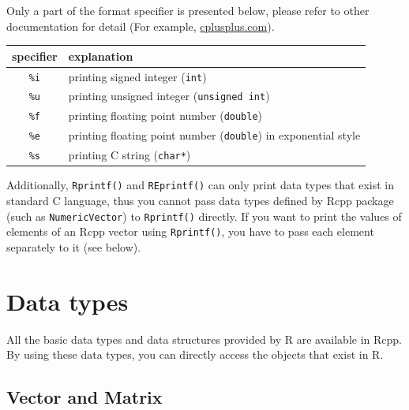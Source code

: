 \documentclass[]{book}
\newenvironment{Shaded}{\begin{snugshade}}{\end{snugshade}}
\newcommand{\CommentTok}[1]{\textcolor[rgb]{0.56,0.35,0.01}{\textit{#1}}}
\newcommand{\ControlFlowTok}[1]{\textcolor[rgb]{0.13,0.29,0.53}{\textbf{#1}}}
\newcommand{\DataTypeTok}[1]{\textcolor[rgb]{0.13,0.29,0.53}{#1}}
\newcommand{\DecValTok}[1]{\textcolor[rgb]{0.00,0.00,0.81}{#1}}
\newcommand{\NormalTok}[1]{#1}
\newcommand{\SpecialCharTok}[1]{\textcolor[rgb]{0.00,0.00,0.00}{#1}}
\newcommand{\StringTok}[1]{\textcolor[rgb]{0.31,0.60,0.02}{#1}}
\begin{document}
Only a part of the format specifier is presented below, please refer to other documentation for detail (For example, \href{http://www.cplusplus.com/reference/cstdio/printf/}{cplusplus.com}).

\begin{longtable}[]{@{}cl@{}}
\toprule
specifier & explanation\tabularnewline
\midrule
\endhead
\texttt{\%i} & printing signed integer (\texttt{int})\tabularnewline
\texttt{\%u} & printing unsigned integer (\texttt{unsigned\ int})\tabularnewline
\texttt{\%f} & printing floating point number (\texttt{double})\tabularnewline
\texttt{\%e} & printing floating point number (\texttt{double}) in exponential style\tabularnewline
\texttt{\%s} & printing C string (\texttt{char*})\tabularnewline
\bottomrule
\end{longtable}

Additionally, \texttt{Rprintf()} and \texttt{REprintf()} can only print data types that exist in standard C language, thus you cannot pass data types defined by Rcpp package (such as \texttt{NumericVector}) to \texttt{Rprintf()} directly. If you want to print the values of elements of an Rcpp vector using \texttt{Rprintf()}, you have to pass each element separately to it (see below).

\begin{Shaded}
\end{Shaded}

\hypertarget{data-types}{%
\chapter{Data types}\label{data-types}}

All the basic data types and data structures provided by R are available in Rcpp. By using these data types, you can directly access the objects that exist in R.

\hypertarget{vector-and-matrix}{%
\section{Vector and Matrix}\label{vector-and-matrix}}
\end{document}
